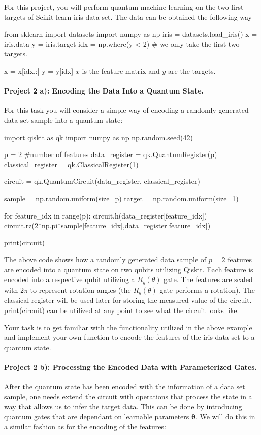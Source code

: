 \documentclass[%
oneside,                 %
final,                   %
10pt]{article}
\begin{document}
For this project, you will perform quantum machine learning on the two first targets of Scikit learn iris data set. The data can be obtained the following way

\bpycod
from sklearn import datasets
import numpy as np
iris = datasets.load_iris()
x = iris.data
y = iris.target
idx = np.where(y < 2) # we only take the first two targets.

x = x[idx,:]
y = y[idx]
\epycod
$x$ is the feature matrix and $y$ are the targets.

\paragraph{Project 2 a): Encoding the Data Into a Quantum State.}
For this task you will consider a simple way of encoding a randomly generated data set sample into a quantum state:

\bpycod
import qiskit as qk
import numpy as np
np.random.seed(42)

p = 2 #number of features
data_register = qk.QuantumRegister(p)
classical_register = qk.ClassicalRegister(1)

circuit = qk.QuantumCircuit(data_register, classical_register)

sample = np.random.uniform(size=p)
target = np.random.uniform(size=1)

for feature_idx in range(p):
    circuit.h(data_register[feature_idx])
    circuit.rz(2*np.pi*sample[feature_idx],data_register[feature_idx])

print(circuit)
\epycod

The above code shows how a randomly generated data sample of $p=2$
features are encoded into a quantum state on two qubits utilizing
Qiskit. Each feature is encoded into a respective qubit utilizing a
$R_y(\theta)$ gate. The features are scaled with $2\pi$ to represent
rotation angles (the $R_y(\theta)$ gate performs a rotation). The
classical register will be used later for storing the measured value
of the circuit.  print(circuit) can be utilized at any point to see
what the circuit looks like.



Your task is to get familiar with the functionality utilized in the
above example and implement your own function to encode the
features of the iris data set to a quantum state.


\paragraph{Project 2 b): Processing the Encoded Data with Parameterized Gates.}
After the quantum state has been encoded with the information of a data set sample, one needs extend the circuit with operations that process the state in a way that allows us to infer the target data. This can be done by introducing quantum gates that are dependant on learnable parameters $\boldsymbol{\theta}$. We will do this in a similar fashion as for the encoding of the features:
\end{document}
